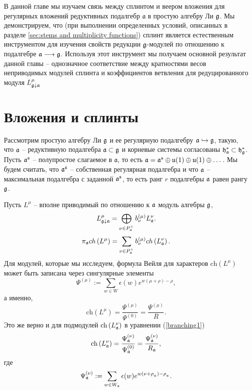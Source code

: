 В данной главе мы изучаем связь между сплинтом и веером вложения для регулярных вложений редуктивных подалгебр ${\mathfrak a}$ в простую алгебру Ли $\mathfrak{g}$. Мы демонстрируем, что (при выполнении определенных условий, описанных в разделе \ref{sec:stems and multiplicity functions}) сплинт является естественным инструментом для изучения свойств редукции  $\mathfrak{g}$-модулей по отношению к подалгебре $\mathfrak{a}\longrightarrow\mathfrak{g}$. Используя этот инструмент мы получаем основной результат данной главы -- однозначное соответствие между кратностями весов неприводимых модулей сплинта и коэффициентов ветвления для редуцированного модуля $L^{\mu}_{\mathfrak{g}\downarrow \mathfrak{a}}$

\section{Вложения и сплинты}

\label{sec:Injections and splints}

Рассмотрим простую алгебру Ли $\mathfrak{g}$ и ее  регулярную подалгебру $\mathfrak{a} \hookrightarrow \mathfrak{g}$, такую, что $\mathfrak{a}$ -- редуктивную подалгебра $\mathfrak{a}\subset \mathfrak{g}$ и корневые системы согласованы $\mathfrak{h}_{\mathfrak{a}}^{\ast}\subset\mathfrak{h}_{\mathfrak{g}}^{\ast}$. Пусть $\mathfrak{a}^{\mathfrak{s}}$ -- полупростое слагаемое в $\mathfrak{a}$, то есть  $\mathfrak{a}=\mathfrak{a}^{\mathfrak{s}} \oplus \mathfrak{u}(1)\oplus \mathfrak{u}(1)\oplus \dots$. Мы будем считать, что $\mathfrak{a}^{\mathfrak{s}}$ -- собственная регулярная подалгебра и что $\mathfrak{a}$ -- максимальная подалгебра с заданной  $\mathfrak{a}^{\mathfrak{s}}$, то есть ранг $r$ подалгебры $\mathfrak{a}$ равен рангу $\mathfrak{g}$.


Пусть $L^{\mu }$ -- вполне приводимый по отношению к  $\mathfrak{a}$ модуль алгебры $\mathfrak{g}$,
\[
L_{\gf\downarrow \af}^{\mu }=\bigoplus\limits_{\nu \in P_{\af%
}^{+}}b_{\nu }^{\left( \mu \right) }L_{\af}^{\nu }.
\]
\begin{equation}
\pi _{\af}ch\left( L^{\mu }\right) =\sum_{\nu \in P_{\af%
}^{+}}b_{\nu }^{(\mu )}ch\left( L_{\af}^{\nu }\right) .
\label{branching1}
\end{equation}
Для модулей, которые мы исследуем, формула Вейля для характеров $\mathrm{ch}\left(L^{\mu }\right) $ может быть записана через сингулярные элементы \cite{humphreys1997introduction}
\[
\Psi ^{\left( \mu \right) }:=\sum\limits_{w\in W}\epsilon (w)e^{w(\mu +\rho
)-\rho },
\]
а именно,
\begin{equation}
\mathrm{ch}\left( L^{\mu }\right) =\frac{\Psi ^{\left( \mu \right) }}{\Psi
^{\left( 0\right) }}=\frac{\Psi ^{\left( \mu \right) }}{R}.
\label{Weyl-Kac2}
\end{equation}
Это же верно и для подмодулей $\mathrm{ch}\left( L_{\mathfrak{a}}^{\nu}\right) $ в уравнении (\ref{branching1})
\[
\mathrm{ch}\left( L_{\af}^{\nu }\right) =\frac{\Psi _{\af}^{\left(
\nu \right) }}{\Psi _{\af}^{\left( 0\right) }}=\frac{\Psi _{\af%
}^{\left( \nu \right) }}{R_{\af}},
\]
где
\[
\Psi _{\af}^{\left( \nu \right) }:=\sum\limits_{w\in W_{\af%
}}\epsilon (w)e^{w(\nu +\rho _{_{\af}})-\rho _{_{\af}}}.
\]

